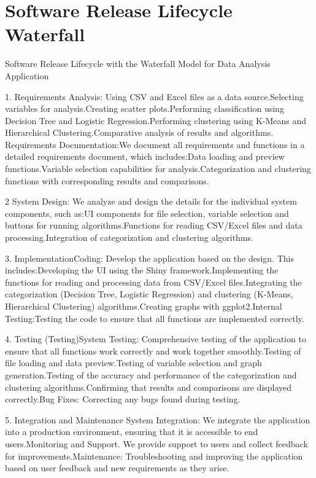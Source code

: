 \documentclass{article}
\begin{document}
\section{ Software Release Lifecycle Waterfall}
Software Release Lifecycle with the Waterfall Model for Data Analysis Application

1. Requirements Analysis:
Using CSV and Excel files as a data source.Selecting variables for
analysis.Creating scatter plots.Performing classification using Decision Tree and Logistic Regression.Performing clustering using K-Means and Hierarchical Clustering.Comparative analysis of results and algorithms. Requirements Documentation:We document all requirements and functions in a
detailed requirements document, which includes:Data loading and preview
functions.Variable selection capabilities for analysis.Categorization and clustering functions with corresponding results and comparisons.

2 System Design:
We analyze and design the details for the individual system components, such as:UI components for file selection, variable selection and buttons for running algorithms.Functions for reading CSV/Excel files and data processing.Integration of categorization and clustering algorithms.

3. ImplementationCoding:
Develop the application based on the design. This
includes:Developing the UI using the Shiny framework.Implementing the functions for reading and processing data from CSV/Excel files.Integrating the categorization (Decision Tree, Logistic Regression) and clustering (K-Means, Hierarchical Clustering) algorithms.Creating graphs with ggplot2.Internal Testing:Testing the code to ensure that all functions are implemented correctly.

4. Testing (Testing)System Testing:
Comprehensive testing of the application to ensure that
all functions work correctly and work together smoothly.Testing of file loading and data preview.Testing of variable selection and graph generation.Testing of the accuracy and performance of the categorization and clustering algorithms.Confirming that results and comparisons are displayed correctly.Bug Fixes: Correcting any bugs found during testing.

5. Integration and Maintenance System Integration:
We integrate the application into a production environment, ensuring that it is accessible to end users.Monitoring and Support. We provide support to users and collect feedback for improvements.Maintenance:
Troubleshooting and improving the application based on user feedback and new
requirements as they arise.
\end{document}
